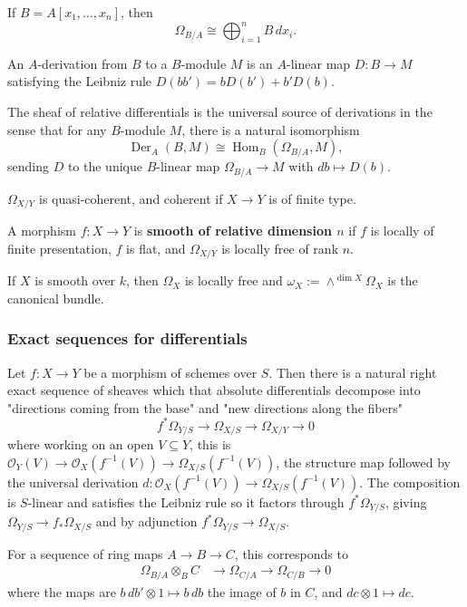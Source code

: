 \documentclass[12pt]{article}
\begin{document}
\begin{example}
    If $B = A[x_1,\dots,x_n]$, then
    \[
        \Omega_{B/A} \cong \bigoplus_{i=1}^n B\,dx_i.
    \]
\end{example}


\begin{definition}
    An $A$-derivation from $B$ to a $B$-module $M$ is an $A$-linear map $D:B \to M$
    satisfying the Leibniz rule $D(bb') = bD(b') + b'D(b)$.
\end{definition}
The sheaf of relative differentials is the universal source of derivations in the sense that for any $B$-module $M$, there is a natural isomorphism
    \[
        \operatorname{Der}_A(B,M) \cong \operatorname{Hom}_B(\Omega_{B/A},M),
    \]
    sending $D$ to the unique $B$-linear map $\Omega_{B/A} \to M$ with $db \mapsto D(b)$.

\begin{proposition}
    $\Omega_{X/Y}$ is quasi-coherent, and coherent if $X \to Y$ is of finite type.
\end{proposition}

\begin{definition}
    A morphism $f:X \to Y$ is \textbf{smooth of relative dimension $n$} if $f$ is locally of finite presentation, $f$ is flat, and $\Omega_{X/Y}$ is locally free of rank $n$.
\end{definition}

\begin{example}
    If $X$ is smooth over $k$, then $\Omega_X$ is locally free and $\omega_X := \wedge^{\dim X} \Omega_X$ is the canonical bundle.
\end{example}

\subsubsection{Exact sequences for differentials}

\begin{proposition}

    Let $f:X \to Y$ be a morphism of schemes over $S$.
    Then there is a natural right exact sequence of sheaves which that absolute differentials decompose into
    "directions coming from the base" and "new directions along the fibers"
    \[
        f^*\Omega_{Y/S} \longrightarrow \Omega_{X/S} \longrightarrow \Omega_{X/Y} \longrightarrow 0
    \]
    where working on an open $V\subseteq Y$, this is
    $\mathcal O_Y(V)\to \mathcal O_X(f^{-1}(V))\to \Omega_{X/S}(f^{-1}(V))$, the structure map followed by the universal derivation $d:\mathcal O_X(f^{-1}(V))\to \Omega_{X/S}(f^{-1}(V))$. The composition is $S$-linear and satisfies the Leibniz rule so it factors through $f^*\Omega_{Y/S}$, giving $\Omega_{Y/S}\to f_*\Omega_{X/S}$
    and by adjunction $f^*\Omega_{Y/S}\to \Omega_{X/S}$.
\end{proposition}
For a sequence of ring maps $A \to B \to C$, this corresponds to
\begin{align*}
    \Omega_{B/A} \otimes_B C & \longrightarrow \Omega_{C/A} \longrightarrow \Omega_{C/B} \longrightarrow 0
\end{align*} where the maps are $b\,db' \otimes 1 \longmapsto b\,db$ the image of $b$ in $C$, and $dc \otimes 1 \longmapsto dc$.
\end{document}
